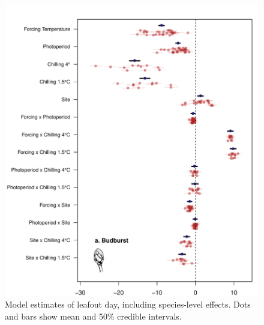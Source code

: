 \documentclass{article}
\begin{document}
\begin{figure}
\includegraphics[width=1\textwidth, page=2]{Fig1_bb_lo+sp}
\caption{Model estimates of leafout day, including species-level effects. Dots and bars show mean and 50\% credible intervals.}
\label{fig:figS3}
\end{figure}
\end{document}
